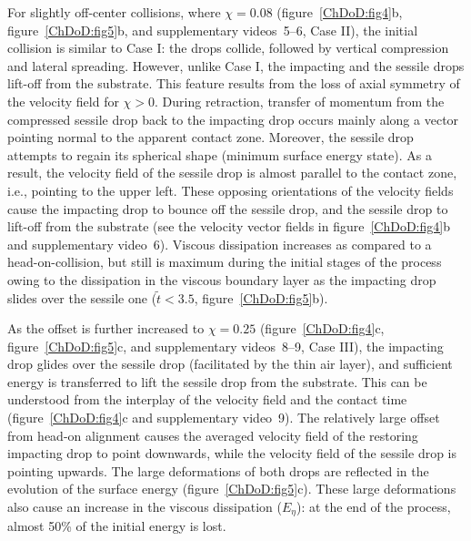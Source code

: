 For slightly off-center collisions, where $\chi=0.08$ (figure~\ref{ChDoD:fig4}b, figure~\ref{ChDoD:fig5}b, and supplementary videos~{\color{Myfig}5--6}, Case II), the initial collision is similar to Case I: the drops collide, followed by vertical compression and lateral spreading. However, unlike Case I, the impacting and the sessile drops lift-off from the substrate. This feature results from the loss of axial symmetry of the velocity field for $\chi > 0$. During retraction, transfer of momentum from the compressed sessile drop back to the impacting drop occurs mainly along a vector pointing normal to the apparent contact zone. Moreover, the sessile drop attempts to regain its spherical shape (minimum surface energy state). As a result, the velocity field of the sessile drop is almost parallel to the contact zone, i.e., pointing to the upper left. These opposing orientations of the velocity fields cause the impacting drop to bounce off the sessile drop, and the sessile drop to lift-off from the substrate (see the velocity vector fields in figure~\ref{ChDoD:fig4}b and supplementary video~{\color{Myfig}6}). Viscous dissipation increases as compared to a head-on-collision, but still is maximum during the initial stages of the process owing to the dissipation in the viscous boundary layer as the impacting drop slides over the sessile one ($\tilde{t} < 3.5$, figure~\ref{ChDoD:fig5}b).

As the offset is further increased to $\chi = 0.25$ (figure~\ref{ChDoD:fig4}c, figure~\ref{ChDoD:fig5}c, and supplementary videos~{\color{Myfig}8--9}, Case III), the impacting drop glides over the sessile drop (facilitated by the thin air layer), and sufficient energy is transferred to lift the sessile drop from the substrate. This can be understood from the interplay of the velocity field and the contact time (figure~\ref{ChDoD:fig4}c and supplementary video~{\color{Myfig}9}). The relatively large offset from head-on alignment causes the averaged velocity field of the restoring impacting drop to point downwards, while the velocity field of the sessile drop is pointing upwards. The large deformations of both drops are reflected in the evolution of the surface energy (figure~\ref{ChDoD:fig5}c). These large deformations also cause an increase in the viscous dissipation ($E_\eta$): at the end of the process, almost 50\% of the initial energy is lost.

